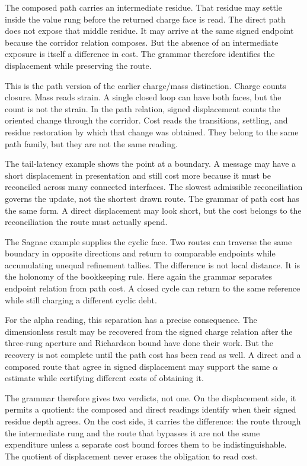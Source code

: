 The composed path carries an intermediate residue. That residue may settle
inside the value rung before the returned charge face is read. The direct
path does not expose that middle residue. It may arrive at the same signed
endpoint because the corridor relation composes. But the absence of an
intermediate exposure is itself a difference in cost. The grammar therefore
identifies the displacement while preserving the route.

This is the path version of the earlier charge/mass distinction. Charge
counts closure. Mass reads strain. A single closed loop can have both faces,
but the count is not the strain. In the path relation, signed displacement
counts the oriented change through the corridor. Cost reads the transitions,
settling, and residue restoration by which that change was obtained. They
belong to the same path family, but they are not the same reading.

The tail-latency example shows the point at a boundary. A message may have a
short displacement in presentation and still cost more because it must be
reconciled across many connected interfaces. The slowest admissible
reconciliation governs the update, not the shortest drawn route. The grammar
of path cost has the same form. A direct displacement may look short, but
the cost belongs to the reconciliation the route must actually spend.

The Sagnac example supplies the cyclic face. Two routes can traverse the
same boundary in opposite directions and return to comparable endpoints while
accumulating unequal refinement tallies. The difference is not local
distance. It is the holonomy of the bookkeeping rule. Here again the grammar
separates endpoint relation from path cost. A closed cycle can return to the
same reference while still charging a different cyclic debt.

For the alpha reading, this separation has a precise consequence. The
dimensionless result may be recovered from the signed charge relation after
the three-rung aperture and Richardson bound have done their work. But the
recovery is not complete until the path cost has been read as well. A direct
and a composed route that agree in signed displacement may support the same
\(\alpha\) estimate while certifying different costs of obtaining it.

The grammar therefore gives two verdicts, not one. On the displacement side,
it permits a quotient: the composed and direct readings identify when their
signed residue depth agrees. On the cost side, it carries the difference:
the route through the intermediate rung and the route that bypasses it are
not the same expenditure unless a separate cost bound forces them to be
indistinguishable. The quotient of displacement never erases the obligation
to read cost.

